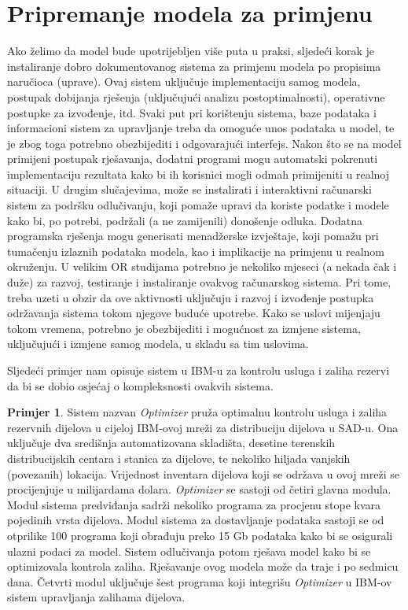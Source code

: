 \documentclass[a4paper, utf8, 11pt, colorlinks]{book}
\theoremstyle{definition}
\newtheorem{primjer}{Primjer}[chapter]
\begin{document}
\section{Pripremanje modela za primjenu}
Ako želimo da model bude upotrijebljen više puta u praksi, sljedeći  korak je instaliranje dobro dokumentovanog sistema za primjenu modela po propisima naručioca (uprave). Ovaj sistem uključuje implementaciju samog modela, postupak dobijanja rješenja (uključujući analizu postoptimalnosti), operativne postupke za izvođenje, itd. %
Svaki put pri korištenju sistema, baze podataka i informacioni sistem za upravljanje treba da omoguće unos podataka u model, te je zbog toga potrebno obezbijediti i odgovarajući interfejs. Nakon što se na model primijeni postupak rješavanja, dodatni  programi mogu automatski pokrenuti implementaciju rezultata kako bi ih korisnici mogli odmah primijeniti u realnoj situaciji. U drugim slučajevima, može se instalirati i interaktivni računarski sistem  za podršku odlučivanju, koji pomaže upravi da koriste podatke i modele kako bi, po potrebi, podržali (a ne zamijenili)   donošenje odluka. Dodatna programska rješenja mogu generisati menadžerske izvještaje, koji pomažu pri tumačenju izlaznih podataka modela, kao i implikacije na primjenu u realnom okruženju.  U velikim OR studijama potrebno je nekoliko mjeseci (a nekada čak i duže) za razvoj, testiranje i instaliranje ovakvog računarskog sistema. Pri tome, treba uzeti u obzir da ove aktivnosti uključuju i razvoj i izvođenje postupka održavanja sistema  tokom njegove buduće upotrebe. Kako se uslovi mijenjaju tokom vremena, potrebno je obezbijediti i mogućnost za  izmjene sistema, uključujući i izmjene samog modela, u skladu sa tim uslovima.  

Sljedeći primjer nam opisuje sistem u IBM-u za kontrolu usluga i zaliha rezervi da bi se dobio osjećaj o kompleksnosti ovakvih sistema.  

\begin{primjer}\label{primjer:IMBOptimizer}
Sistem nazvan \emph{Optimizer} pruža optimalnu kontrolu usluga i zaliha rezervnih dijelova u cijeloj IBM-ovoj mreži za distribuciju dijelova u SAD-u. Ona uključuje dva središnja
automatizovana skladišta, desetine terenskih distribucijskih centara i stanica za dijelove, te nekoliko hiljada vanjskih (povezanih) lokacija. Vrijednost inventara dijelova koji se održava u ovoj mreži se procijenjuje u milijardama dolara. \emph{Optimizer} se sastoji od četiri glavna modula. Modul sistema predviđanja sadrži nekoliko programa za procjenu stope kvara pojedinih vrsta dijelova. Modul sistema za dostavljanje podataka sastoji se od otprilike 100 programa koji    obrađuju
preko 15 Gb podataka kako bi se osigurali ulazni podaci za model. Sistem odlučivanja potom rješava model kako bi se optimizovala kontrola zaliha. Rješavanje ovog modela može da traje i po sedmicu dana. Četvrti modul uključuje šest programa koji integrišu \emph{Optimizer} u IBM-ov sistem upravljanja zalihama dijelova. %
\end{primjer} 
\end{document}

